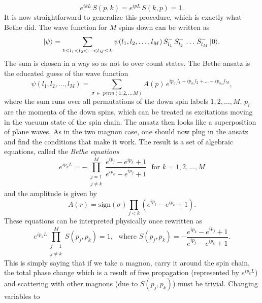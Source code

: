 \begin{equation}
	e^{ikL} \, S(p,k) = e^{ipL} \, S(k, p) = 1.
\end{equation}
It is now straightforward to generalize this procedure, which is exactly what Bethe did. 
The wave function for $M$ spins down can be written as
\begin{equation}
	|\psi\rangle = \sum_{1 \leq l_1 < l_2 < \dots < l_M \leq L} \psi(l_1, l_2, \dots, l_M) \, S^-_{l_1} \, S^-_{l_2} \, \dots \, S^-_{l_M} \, |0\rangle.
\end{equation}
The sum is chosen in a way so as not to over count states. The Bethe ansatz is the educated guess of the wave function
\begin{equation}
	\psi(l_1, l_2, \dots, l_M) = \sum_{\sigma \, \in \; perm(1,2,\dots\,M)} A(p) \, e^{ip_{\sigma_1} l_1 + ip_{\sigma_2} l_2 + \dots + ip_{\sigma_M} l_M}, 
\end{equation}
where the sum runs over all permutations of the down spin labels $1, 2, \dots, M$. 
$p_i$ are the momenta of the down spins, which can be treated as excitations moving in the vacuum state of the spin chain. 
The ansatz then looks like a superposition of plane waves. 
As in the two magnon case, one should now plug in the ansatz and find the conditions that make it work. 
The result is a set of algebraic equations, called the \emph{Bethe equations}
\begin{equation}
	e^{ip_k L} = - \prod_{\substack{j=1 \\ j \neq k}}^M \frac{e^{ip_j} - e^{ip_k} + 1}{e^{ip_k} - e^{ip_j} + 1} \,\,\,\, \mathrm{for} \,\, k = 1,2, \dots, M
	\label{eq:bethe_coordinate}
\end{equation}
and the amplitude is given by
\begin{equation}
	A(r) = \mathrm{sign}(\sigma) \prod_{j<k} \left( e^{ip_j} - e^{ip_k} + 1 \right).
\end{equation}
These equations can be interpreted physically once rewritten as
\begin{equation}
	e^{ip_k L} \prod_{\substack{j=1 \\ j \neq k}}^M S(p_j, p_k) = 1, \,\,\,\, \mathrm{where} \,\, S(p_j, p_k) = -\frac{e^{ip_k} - e^{ip_j} + 1}{e^{ip_j} - e^{ip_k} + 1}.
	\label{eq:CBA}
\end{equation}
This is simply saying that if we take a magnon, carry it around the spin chain, the total phase change which is a result of free propagation (represented by $e^{ip_k L}$) and scattering with other magnons (due to $S(p_j,p_k)$) must be trivial.  
Changing variables to
